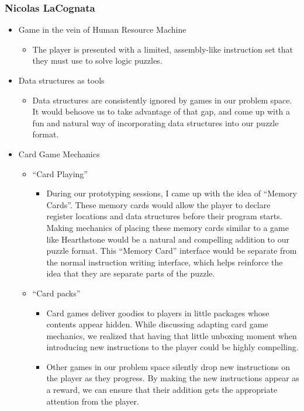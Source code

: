 \documentclass{article}
\begin{document}
\subsubsection{Nicolas LaCognata}
\begin{itemize}
  \item Game in the vein of Human Resource Machine
  \begin{itemize}
    \item The player is presented with a limited, assembly-like instruction set
    that they must use to solve logic puzzles.
  \end{itemize}
  \item Data structures as tools
  \begin{itemize}
    \item Data structures are consistently ignored by games in our problem
    space. It would behoove us to take advantage of that gap, and come up with a
    fun and natural way of incorporating data structures into our puzzle format.
  \end{itemize}
  \item Card Game Mechanics
  \begin{itemize}
    \item “Card Playing”
    \begin{itemize}
      \item During our prototyping sessions, I came up with the idea of “Memory
      Cards”. These memory cards would allow the player to declare register
      locations and data structures before their program starts. Making
      mechanics of placing these memory cards similar to a game like Hearthstone
      would be a natural and compelling addition to our puzzle format. This
      “Memory Card” interface would be separate from the normal instruction
      writing interface, which helps reinforce the idea that they are separate
      parts of the puzzle.
    \end{itemize}
    \item “Card packs”
    \begin{itemize}
      \item Card games deliver goodies to players in little packages whose
      contents appear hidden. While discussing adapting card game mechanics, we
      realized that having that little unboxing moment when introducing new
      instructions to the player could be highly compelling.
      \item Other games in our problem space silently drop new instructions on
      the player as they progress. By making the new instructions appear as a
      reward, we can ensure that their addition gets the appropriate attention
      from the player.
    \end{itemize}
  \end{itemize}
\end{itemize}
\end{document}
